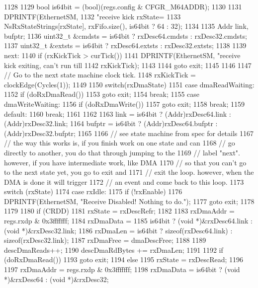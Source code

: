 \begin{DoxyCode}
1128 {
1129     bool is64bit = (bool)(regs.config & CFGR_M64ADDR);
1130 
1131     DPRINTF(EthernetSM,
1132             "receive kick rxState=%
1133             NsRxStateStrings[rxState], rxFifo.size(), is64bit ? 64 : 32);
1134 
1135     Addr link, bufptr;
1136     uint32_t &cmdsts = is64bit ? rxDesc64.cmdsts : rxDesc32.cmdsts;
1137     uint32_t &extsts = is64bit ? rxDesc64.extsts : rxDesc32.extsts;
1138 
1139   next:
1140     if (rxKickTick > curTick()) {
1141         DPRINTF(EthernetSM, "receive kick exiting, can't run till %
1142                 rxKickTick);
1143 
1144         goto exit;
1145     }
1146 
1147     // Go to the next state machine clock tick.
1148     rxKickTick = clockEdge(Cycles(1));
1149 
1150     switch(rxDmaState) {
1151       case dmaReadWaiting:
1152         if (doRxDmaRead())
1153             goto exit;
1154         break;
1155       case dmaWriteWaiting:
1156         if (doRxDmaWrite())
1157             goto exit;
1158         break;
1159       default:
1160         break;
1161     }
1162 
1163     link = is64bit ? (Addr)rxDesc64.link : (Addr)rxDesc32.link;
1164     bufptr = is64bit ? (Addr)rxDesc64.bufptr : (Addr)rxDesc32.bufptr;
1165 
1166     // see state machine from spec for details
1167     // the way this works is, if you finish work on one state and can
1168     // go directly to another, you do that through jumping to the
1169     // label "next".  however, if you have intermediate work, like DMA
1170     // so that you can't go to the next state yet, you go to exit and
1171     // exit the loop.  however, when the DMA is done it will trigger
1172     // an event and come back to this loop.
1173     switch (rxState) {
1174       case rxIdle:
1175         if (!rxEnable) {
1176             DPRINTF(EthernetSM, "Receive Disabled! Nothing to do.\n");
1177             goto exit;
1178         }
1179 
1180         if (CRDD) {
1181             rxState = rxDescRefr;
1182 
1183             rxDmaAddr = regs.rxdp & 0x3fffffff;
1184             rxDmaData =
1185                 is64bit ? (void *)&rxDesc64.link : (void *)&rxDesc32.link;
1186             rxDmaLen = is64bit ? sizeof(rxDesc64.link) : sizeof(rxDesc32.link);
1187             rxDmaFree = dmaDescFree;
1188 
1189             descDmaReads++;
1190             descDmaRdBytes += rxDmaLen;
1191 
1192             if (doRxDmaRead())
1193                 goto exit;
1194         } else {
1195             rxState = rxDescRead;
1196 
1197             rxDmaAddr = regs.rxdp & 0x3fffffff;
1198             rxDmaData = is64bit ? (void *)&rxDesc64 : (void *)&rxDesc32;
}}}
\end{DoxyCode}
